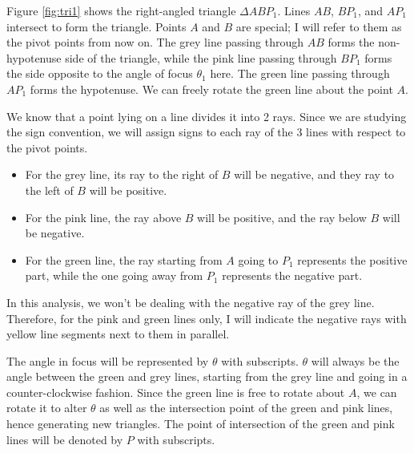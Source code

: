 \documentclass{article}
\begin{document}
Figure \ref{fig:tri1} shows the right-angled triangle $\Delta ABP_1$. Lines $AB$, $BP_1$, and $AP_1$ intersect to form the triangle. Points $A$ and $B$ are special; I will refer to them as the pivot points from now on. The grey line passing through $AB$ forms the non-hypotenuse side of the triangle, while the pink line passing through $BP_1$ forms the side opposite to the angle of focus $\theta_1$ here. The green line passing through $AP_1$ forms the hypotenuse. We can freely rotate the green line about the point $A$.

We know that a point lying on a line divides it into 2 rays. Since we are studying the sign convention, we will assign signs to each ray of the 3 lines with respect to the pivot points. 

\begin{itemize}
    \item For the grey line, its ray to the right of $B$ will be negative, and they ray to the left of $B$ will be positive. 
    \item For the pink line, the ray above $B$ will be positive, and the ray below $B$ will be negative. 
    \item For the green line, the ray starting from $A$ going to $P_1$ represents the positive part, while the one going away from $P_1$ represents the negative part.
\end{itemize}

In this analysis, we won't be dealing with the negative ray of the grey line. Therefore, for the pink and green lines only, I will indicate the negative rays with yellow line segments next to them in parallel.

The angle in focus will be represented by $\theta$ with subscripts. $\theta$ will always be the angle between the green and grey lines, starting from the grey line and going in a counter-clockwise fashion. Since the green line is free to rotate about $A$, we can rotate it to alter $\theta$ as well as the intersection point of the green and pink lines, hence generating new triangles. The point of intersection of the green and pink lines will be denoted by $P$ with subscripts.
\end{document}
